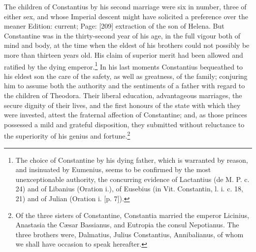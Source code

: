 The children of Constantius by his second marriage were six in number, three of either sex, and whose Imperial descent might have solicited a preference over the meaner Edition: current; Page: [209] extraction of the son of Helena. But Constantine was in the thirty-second year of his age, in the full vigour both of mind and body, at the time when the eldest of his brothers could not possibly be more than thirteen years old. His claim of superior merit had been allowed and ratified by the dying emperor.\footnote{The choice of Constantine by his dying father, which is warranted by reason, and insinuated by Eumenius, seems to be confirmed by the most unexceptionable authority, the concurring evidence of Lactantius (de M. P. c. 24) and of Libanius (Oration i.), of Eusebius (in Vit. Constantin, l. i. c. 18, 21) and of Julian (Oration i. [p. 7]).} In his last moments Constantius bequeathed to his eldest son the care of the safety, as well as greatness, of the family; conjuring him to assume both the authority and the sentiments of a father with regard to the children of Theodora. Their liberal education, advantageous marriages, the secure dignity of their lives, and the first honours of the state with which they were invested, attest the fraternal affection of Constantine; and, as those princes possessed a mild and grateful disposition, they submitted without reluctance to the superiority of his genius and fortune.\footnote{Of the three sisters of Constantine, Constantia married the emperor Licinius, Anastasia the Cæsar Bassianus, and Eutropia the consul Nepotianus. The three brothers were, Dalmatius, Julius Constantius, Annibalianus, of whom we shall have occasion to speak hereafter.}

